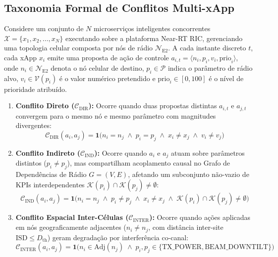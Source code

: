 \documentclass[12pt]{article}
\begin{document}
\subsection{Taxonomia Formal de Conflitos Multi-xApp}

Considere um conjunto de $N$ microserviços inteligentes concorrentes $\mathcal{X} = \{x_1, x_2, \dots, x_N\}$ executando sobre a plataforma Near-RT RIC, gerenciando uma topologia celular composta por nós de rádio $\mathcal{N}_{\text{E2}}$. A cada instante discreto $t$, cada xApp $x_i$ emite uma proposta de ação de controle $a_{i,t} = \langle n_i, p_i, v_i, \text{prio}_i \rangle$, onde $n_i \in \mathcal{N}_{\text{E2}}$ denota o nó celular de destino, $p_i \in \mathcal{P}$ indica o parâmetro de rádio alvo, $v_i \in \mathcal{V}(p_i)$ é o valor numérico pretendido e $\text{prio}_i \in [0, 100]$ é o nível de prioridade atribuído.

\begin{enumerate}
    \item \textbf{Conflito Direto ($\mathcal{C}_{\text{DIR}}$):} Ocorre quando duas propostas distintas $a_{i,t}$ e $a_{j,t}$ convergem para o mesmo nó e mesmo parâmetro com magnitudes divergentes:
    \begin{equation}
        \mathcal{C}_{\text{DIR}}(a_i, a_j) = \mathbf{1} \Big( n_i = n_j \;\land\; p_i = p_j \;\land\; x_i \neq x_j \;\land\; v_i \neq v_j \Big)
    \end{equation}
    \item \textbf{Conflito Indireto ($\mathcal{C}_{\text{IND}}$):} Ocorre quando $a_i$ e $a_j$ atuam sobre parâmetros distintos ($p_i \neq p_j$), mas compartilham acoplamento causal no Grafo de Dependências de Rádio $G = (V, E)$, afetando um subconjunto não-vazio de KPIs interdependentes $\mathcal{K}(p_i) \cap \mathcal{K}(p_j) \neq \emptyset$:
    \begin{equation}
        \mathcal{C}_{\text{IND}}(a_i, a_j) = \mathbf{1} \Big( n_i = n_j \;\land\; p_i \neq p_j \;\land\; x_i \neq x_j \;\land\; \mathcal{K}(p_i) \cap \mathcal{K}(p_j) \neq \emptyset \Big)
    \end{equation}
    \item \textbf{Conflito Espacial Inter-Células ($\mathcal{C}_{\text{INTER}}$):} Ocorre quando ações aplicadas em nós geograficamente adjacentes ($n_i \neq n_j$, com distância inter-site $\text{ISD} \le D_{\text{th}}$) geram degradação por interferência co-canal:
    \begin{equation}
        \mathcal{C}_{\text{INTER}}(a_i, a_j) = \mathbf{1} \Big( n_i \in \text{Adj}(n_j) \;\land\; p_i, p_j \in \{\text{TX\_POWER}, \text{BEAM\_DOWNTILT}\} \Big)
    \end{equation}
\end{enumerate}
\end{document}
